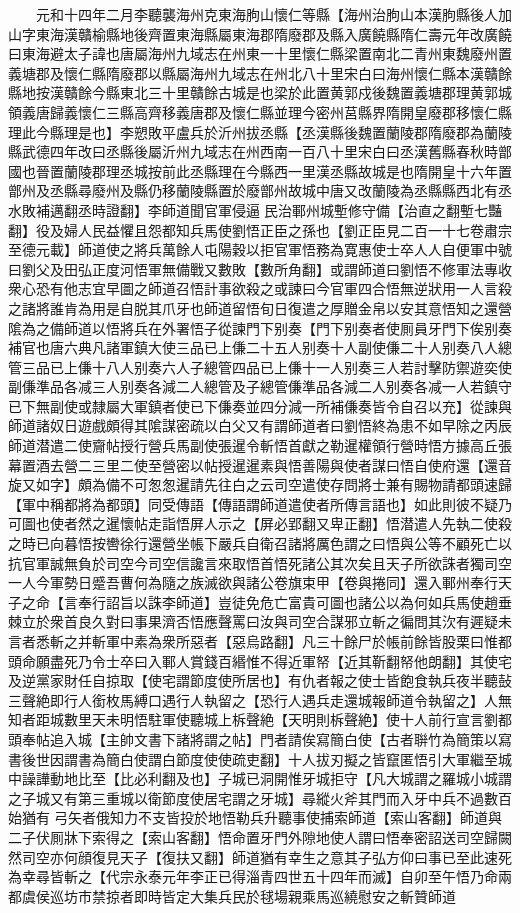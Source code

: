 　　元和十四年二月李聽襲海州克東海朐山懷仁等縣【海州治朐山本漢胊縣後人加山字東海漢贛榆縣地後齊置東海縣屬東海郡隋廢郡及縣入廣饒縣隋仁壽元年改廣饒曰東海避太子諱也唐屬海州九域志在州東一十里懷仁縣梁置南北二青州東魏廢州置義塘郡及懷仁縣隋廢郡以縣屬海州九域志在州北八十里宋白曰海州懷仁縣本漢贛餘縣地按漢贛餘今縣東北三十里贛餘古城是也梁於此置黄郭戍後魏置義塘郡理黄郭城領義唐歸義懷仁三縣高齊移義唐郡及懷仁縣並理今密州莒縣界隋開皇廢郡移懷仁縣理此今縣理是也】李愬敗平盧兵於沂州拔丞縣【丞漢縣後魏置蘭陵郡隋廢郡為蘭陵縣武德四年改曰丞縣後屬沂州九域志在州西南一百八十里宋白曰丞漢舊縣春秋時鄫國也晉置蘭陵郡理丞城按前此丞縣理在今縣西一里漢丞縣故城是也隋開皇十六年置鄫州及丞縣尋廢州及縣仍移蘭陵縣置於廢鄫州故城中唐又改蘭陵為丞縣縣西北有丞水敗補邁翻丞時證翻】李師道聞官軍侵逼民治鄆州城塹修守備【治直之翻塹七豔翻】役及婦人民益懼且怨都知兵馬使劉悟正臣之孫也【劉正臣見二百一十七卷肅宗至德元載】師道使之將兵萬餘人屯陽穀以拒官軍悟務為寛惠使士卒人人自便軍中號曰劉父及田弘正度河悟軍無備戰又數敗【數所角翻】或謂師道曰劉悟不修軍法專收衆心恐有他志宜早圖之師道召悟計事欲殺之或諫曰今官軍四合悟無逆狀用一人言殺之諸將誰肯為用是自脱其爪牙也師道留悟旬日復遣之厚贈金帛以安其意悟知之還營隂為之備師道以悟將兵在外署悟子從諫門下别奏【門下别奏者使厠員牙門下俟别奏補官也唐六典凡諸軍鎮大使三品已上傔二十五人别奏十人副使傔二十人别奏八人總管三品已上傔十八人别奏六人子總管四品已上傔十一人别奏三人若討擊防禦遊奕使副傔準品各减三人别奏各減二人總管及子總管傔準品各減二人别奏各减一人若鎮守已下無副使或隸屬大軍鎮者使已下傔奏並四分減一所補傔奏皆令自召以充】從諫與師道諸奴日遊戲頗得其隂謀密疏以白父又有謂師道者曰劉悟終為患不如早除之丙辰師道潜遣二使齎帖授行營兵馬副使張暹令斬悟首獻之勒暹權領行營時悟方據高丘張幕置酒去營二三里二使至營密以帖授暹暹素與悟善陽與使者謀曰悟自使府還【還音旋又如字】頗為備不可怱怱暹請先往白之云司空遣使存問將士兼有賜物請都頭速歸【軍中稱都將為都頭】同受傳語【傳語謂師道遣使者所傳言語也】如此則彼不疑乃可圖也使者然之暹懷帖走詣悟屏人示之【屏必郢翻又卑正翻】悟潜遣人先執二使殺之時已向暮悟按轡徐行還營坐帳下嚴兵自衛召諸將厲色謂之曰悟與公等不顧死亡以抗官軍誠無負於司空今司空信讒言來取悟首悟死諸公其次矣且天子所欲誅者獨司空一人今軍勢日蹙吾曹何為隨之族滅欲與諸公卷旗束甲【卷與捲同】還入鄆州奉行天子之命【言奉行詔旨以誅李師道】豈徒免危亡富貴可圖也諸公以為何如兵馬使趙垂棘立於衆首良久對曰事果濟否悟應聲罵曰汝與司空合謀邪立斬之徧問其㳄有遲疑未言者悉斬之并斬軍中素為衆所惡者【惡烏路翻】凡三十餘尸於帳前餘皆股栗曰惟都頭命願盡死乃令士卒曰入鄆人賞錢百緡惟不得近軍帑【近其靳翻帑他朗翻】其使宅及逆黨家財任自掠取【使宅謂節度使所居也】有仇者報之使士皆飽食執兵夜半聽鼔三聲絶即行人銜枚馬縛口遇行人執留之【恐行人遇兵走還城報師道令執留之】人無知者距城數里天未明悟駐軍使聽城上柝聲絶【天明則柝聲絶】使十人前行宣言劉都頭奉帖追入城【主帥文書下諸將謂之帖】門者請俟寫簡白使【古者聨竹為簡策以寫書後世因謂書為簡白使謂白節度使使疏吏翻】十人拔刃擬之皆竄匿悟引大軍繼至城中譟譁動地比至【比必利翻及也】子城已洞開惟牙城拒守【凡大城謂之羅城小城謂之子城又有第三重城以衛節度使居宅謂之牙城】尋縱火斧其門而入牙中兵不過數百始猶有弓矢者俄知力不支皆投於地悟勒兵升聽事使捕索師道【索山客翻】師道與二子伏厠牀下索得之【索山客翻】悟命置牙門外隙地使人謂曰悟奉密詔送司空歸闕然司空亦何顔復見天子【復扶又翻】師道猶有幸生之意其子弘方仰曰事已至此速死為幸尋皆斬之【代宗永泰元年李正已得淄青四世五十四年而滅】自卯至午悟乃命兩都虞侯巡坊市禁掠者即時皆定大集兵民於毬場親乘馬巡繞慰安之斬贊師道